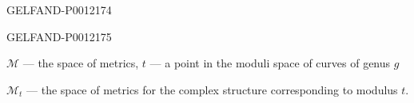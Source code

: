 \begin{GelfandAdjacentEvidence}{GELFAND-P001217}{4}

\end{GelfandAdjacentEvidence}
\begin{GelfandAdjacentEvidence}{GELFAND-P001217}{5}

\end{GelfandAdjacentEvidence}


\(\mathcal M\) --- the space of metrics, \(t\) --- a point in the moduli space of curves of genus \(g\)

\(\mathcal M_t\) --- the space of metrics for the complex structure corresponding to modulus \(t\).


